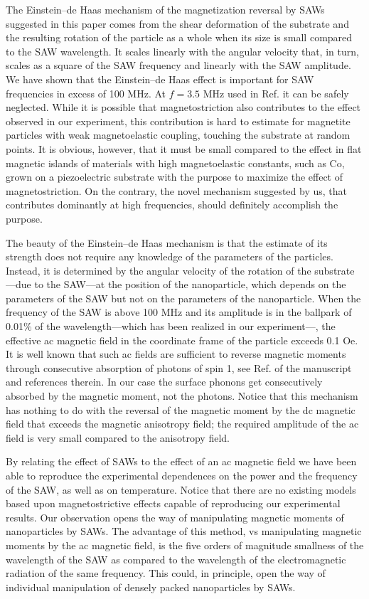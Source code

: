 \documentclass[aps,prb,floats,twocolumn]{revtex4}
\begin{document}
The Einstein--de Haas mechanism of the magnetization reversal by SAWs suggested in this paper comes from the shear deformation of the substrate and the resulting rotation of the particle as a whole when its size is small compared to the SAW wavelength. It scales linearly with the angular velocity that, in turn, scales as a square of the SAW frequency and linearly with the SAW amplitude. We have shown that the Einstein--de Haas effect is important for SAW frequencies in excess of 100 MHz. At $f=3.5$ MHz used in Ref.  it can be safely neglected. While it is possible that magnetostriction also contributes to the effect observed in our experiment, this contribution is hard to estimate for magnetite particles with weak magnetoelastic coupling, touching the substrate at random points. It is obvious, however, that it must be small compared to the effect in flat magnetic islands of materials with high magnetoelastic constants, such as Co, grown on a piezoelectric substrate with the purpose to maximize the effect of magnetostriction.\cite{Sampath-Nano2016} On the contrary, the novel mechanism suggested by us, that contributes dominantly at high frequencies, should definitely accomplish the purpose. 

The beauty of the Einstein--de Haas mechanism is that the estimate of its strength does not require any knowledge of the parameters of the particles. Instead, it is determined by the angular velocity of the rotation of the substrate---due to the SAW---at the position of the nanoparticle, which depends on the parameters of the SAW but not on the parameters of the nanoparticle. When the frequency of the SAW is above 100 MHz and its amplitude is in the ballpark of 0.01\% of the wavelength---which has been realized in our experiment---, the effective ac magnetic field in the coordinate frame of the particle exceeds 0.1 Oe. It is well known that such ac fields are sufficient to reverse magnetic moments through consecutive absorption of photons of spin 1, see Ref.  of the manuscript and references therein. In our case the surface phonons get consecutively absorbed by the magnetic moment, not the photons. Notice that this mechanism has nothing to do with the reversal of the magnetic moment by the dc magnetic field that exceeds the magnetic anisotropy field; the required amplitude of the ac field is very small compared to the anisotropy field. 

By relating the effect of SAWs to the effect of an ac magnetic field we have been able to reproduce the experimental dependences on the power and the frequency of the SAW, as well as on temperature. Notice that there are no existing models based upon magnetostrictive effects capable of reproducing our experimental results. Our observation opens the way of manipulating magnetic moments of nanoparticles by SAWs. The advantage of this method, vs manipulating magnetic moments by the ac magnetic field, is the five orders of magnitude smallness of the wavelength of the SAW as compared to the wavelength of the electromagnetic radiation of the same frequency. This could, in principle, open the way of individual manipulation of densely packed nanoparticles by SAWs.
\end{document}
